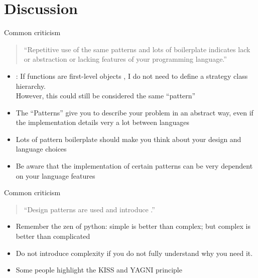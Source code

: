 \section{Discussion}


\begin{frame}{Common criticism}
	\begin{quote}
		\enquote{Repetitive use of the same patterns and lots of boilerplate indicates lack or abstraction or lacking features of your programming language.}
	\end{quote}
	\begin{itemize}
		\item {}: If functions are first-level objects , I do not need to define a strategy class hierarchy. \\
		However, this could still be considered the same \enquote{pattern} 
		\item The \enquote{Patterns} give you  to describe your problem in an abstract way, even if the implementation details very a lot between languages
		\item Lots of pattern boilerplate should make you think about your design and language choices
		\item Be aware that the implementation of  certain patterns can be very dependent on your language features 
	\end{itemize}	
\end{frame}

\begin{frame}{Common criticism}
	\begin{quote}
		\enquote{Design patterns are used  and introduce .}
	\end{quote}
	\begin{itemize}
		\item 
		Remember the zen of python: simple is better than complex; but complex is better than complicated
		\item
		Do not introduce complexity  if you do not fully understand why you need it. 
		\item 
		Some people highlight the KISS  and YAGNI  principle
	\end{itemize}
\end{frame}

